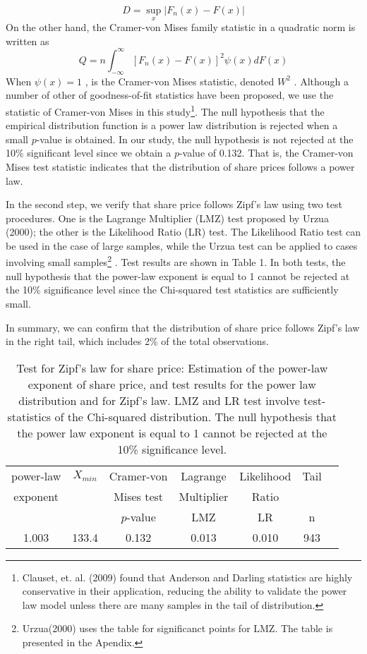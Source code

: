 \documentclass[10pt,a4paper]{article}
\begin{document}
\begin{equation}
 D=\sup_{x} |F_{n}(x)-F(x)|     
\end{equation} 
%
On the other hand, the Cramer-von Mises family statistic in a quadratic norm is written as  
\begin{equation}
Q=n\int_{-\infty}^{\infty}[F_{n}(x)-F(x)]^{2}\psi (x)dF(x) 
\end{equation} 
%
When $\psi(x)=1$ ,   is the Cramer-von Mises statistic, denoted $W^{2}$  . Although a number of other of goodness-of-fit statistics have been proposed, we use the   statistic of Cramer-von Mises in this study\footnote{Clauset, et. al. (2009) found that Anderson and Darling statistics are highly conservative in their application, reducing the ability to validate the power law model unless there are many samples in the tail of distribution.}.  The null hypothesis that the empirical distribution function is a power law distribution is rejected when a small $p$-value is obtained. In our study, the null hypothesis is not rejected at the 10\% significant level since we obtain a $p$-value of 0.132. That is, the Cramer-von Mises test statistic indicates that the distribution of share prices follows a power law. 

In the second step, we verify that share price follows Zipf's law using two test procedures. One is the Lagrange Multiplier (LMZ) test proposed by Urzua (2000); the other is the Likelihood Ratio (LR) test. The Likelihood Ratio test can be used in the case of large samples, while the Urzua test can be applied to cases involving small samples\footnote{Urzua(2000) uses the table for significanct points for LMZ. The table is presented in the Apendix.} . Test results are shown in Table 1. In both tests, the null hypothesis that the power-law exponent is equal to 1 cannot be rejected at the 10\% significance level since the Chi-squared test statistics are sufficiently small.

In summary, we can confirm that the distribution of share price follows Zipf's law in the right tail, which includes 2\% of the total observations. 

\begin{table}[H]
\begin{center}
\begin{tabular}{ccccccc} \hline
power-law & $X_{min}$ & Cramer-von& Lagrange &Likelihood & Tail\\
exponent              &        &  Mises test& Multiplier & Ratio &\\ 
     &    &  $p$-value &  LMZ & LR & n \\ \hline 
1.003 & 133.4 &0.132 & 0.013 & 0.010 & 943 \\ \hline
\end{tabular}
\end{center} 
\caption{Test for Zipf's law for share price: Estimation of the power-law exponent of share price, and test results for the power law distribution and for Zipf's law. LMZ and LR test involve test-statistics of the Chi-squared distribution. The null hypothesis that the power law exponent is equal to 1 cannot be rejected at the 10\% significance level.}
\end{table}
\end{document}
